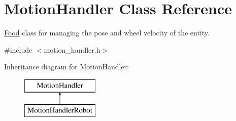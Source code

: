 \hypertarget{class_motion_handler}{}\section{Motion\+Handler Class Reference}
\label{class_motion_handler}


\mbox{\hyperlink{class_food}{Food}} class for managing the pose and wheel velocity of the entity.  




{\ttfamily \#include $<$motion\+\_\+handler.\+h$>$}

Inheritance diagram for Motion\+Handler\+:\begin{figure}[H]
\begin{center}
\leavevmode
\includegraphics[height=2.000000cm]{class_motion_handler}
\end{center}
\end{figure}
